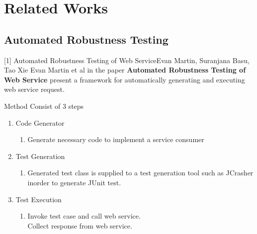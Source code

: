 \documentclass[10pt]{beamer}
\begin{document}
     
 \section{Related Works}    
{\1
\begin{frame}
\begin{block}{}

  \end{block}
\end{frame}}
\subsection{Automated Robustness Testing }
\begin{frame}{[1] Automated Robustness Testing of Web Service}{Evan Martin, Suranjana Basu, Tao Xie}
	Evan Martin et al in the paper \textbf{Automated Robustness Testing of Web Service} present a framework for automatically generating and executing web service request.
	\begin{block}{Method}
	Consist of 3 steps
	\begin{enumerate}
	\item Code Generator
		\begin{enumerate}
		\item Generate necessary code to implement a service consumer
		\end{enumerate}
	\item Test Generation
		\begin{enumerate}
		
		\item Generated test class is supplied to a test generation tool such as JCrasher inorder to generate JUnit test.
		\end{enumerate}
	\item Test Execution
		\begin{enumerate}
		\item Invoke test case and call web service.\\
		Collect response from web service.
		\end{enumerate}
	
	\end{enumerate}
	
	\end{block}

\end{frame}
\end{document}
